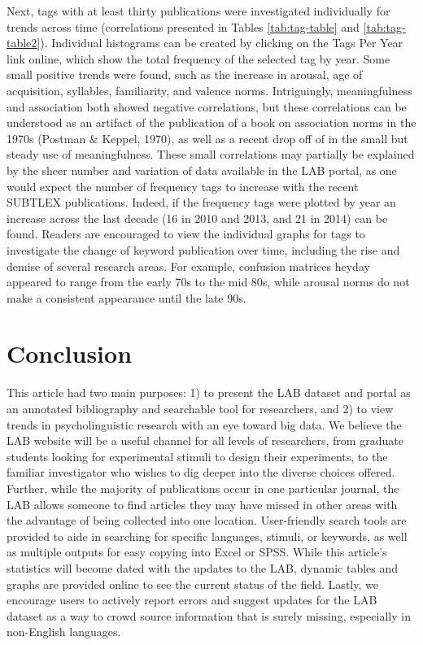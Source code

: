 \documentclass[english,man]{apa6}
\theoremstyle{definition}
\theoremstyle{definition}
\theoremstyle{definition}
\theoremstyle{remark}
\begin{document}
Next, tags with at least thirty publications were investigated
individually for trends across time (correlations presented in Tables
\ref{tab:tag-table} and \ref{tab:tag-table2}). Individual histograms can
be created by clicking on the Tags Per Year link online, which show the
total frequency of the selected tag by year. Some small positive trends
were found, such as the increase in arousal, age of acquisition,
syllables, familiarity, and valence norms. Intriguingly, meaningfulness
and association both showed negative correlations, but these
correlations can be understood as an artifact of the publication of a
book on association norms in the 1970s (Postman \& Keppel, 1970), as
well as a recent drop off of in the small but steady use of
meaningfulness. These small correlations may partially be explained by
the sheer number and variation of data available in the LAB portal, as
one would expect the number of frequency tags to increase with the
recent SUBTLEX publications. Indeed, if the frequency tags were plotted
by year an increase across the last decade (16 in 2010 and 2013, and 21
in 2014) can be found. Readers are encouraged to view the individual
graphs for tags to investigate the change of keyword publication over
time, including the rise and demise of several research areas. For
example, confusion matrices heyday appeared to range from the early 70s
to the mid 80s, while arousal norms do not make a consistent appearance
until the late 90s.

\section{Conclusion}\label{conclusion}

This article had two main purposes: 1) to present the LAB dataset and
portal as an annotated bibliography and searchable tool for researchers,
and 2) to view trends in psycholinguistic research with an eye toward
big data. We believe the LAB website will be a useful channel for all
levels of researchers, from graduate students looking for experimental
stimuli to design their experiments, to the familiar investigator who
wishes to dig deeper into the diverse choices offered. Further, while
the majority of publications occur in one particular journal, the LAB
allows someone to find articles they may have missed in other areas with
the advantage of being collected into one location. User-friendly search
tools are provided to aide in searching for specific languages, stimuli,
or keywords, as well as multiple outputs for easy copying into Excel or
SPSS. While this article's statistics will become dated with the updates
to the LAB, dynamic tables and graphs are provided online to see the
current status of the field. Lastly, we encourage users to actively
report errors and suggest updates for the LAB dataset as a way to crowd
source information that is surely missing, especially in non-English
languages.
\end{document}
